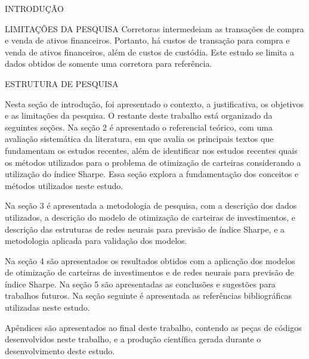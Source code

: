 \begin{section}{INTRODUÇÃO}
\begin{subsection}{LIMITAÇÕES DA PESQUISA}
        \ipar Corretoras intermedeiam as transações de compra e venda de ativos financeiros. Portanto, há custos de transação para compra e venda de ativos financeiros, além de custos de custódia. Este estudo se limita a dados obtidos de somente uma corretora para referência.

    \end{subsection}

    \begin{subsection}{ESTRUTURA DE PESQUISA}
    
        \ipar Nesta seção de introdução, foi apresentado o contexto, a justificativa, os objetivos e as limitações da pesquisa. O restante deste trabalho está organizado da seguintes seções. Na seção 2 é apresentado o referencial teórico, com uma avaliação sistemática da literatura, em que avalia os principais textos que fundamentam os estudos recentes, além de identificar nos estudos recentes quais os métodos utilizados para o problema de otimização de carteiras considerando a utilização do índice Sharpe. Essa seção explora a fundamentação dos conceitos e métodos utilizados neste estudo. 
        
        \ipar Na seção 3 é apresentada a metodologia de pesquisa, com a descrição dos dados utilizados, a descrição do modelo de otimização de carteiras de investimentos, e descrição das estruturas de redes neurais para previsão de índice Sharpe, e a metodologia aplicada para validação dos modelos.
        
        \ipar Na seção 4 são apresentados os resultados obtidos com a aplicação dos modelos de otimização de carteiras de investimentos e de redes neurais para previsão de índice Sharpe. Na seção 5 são apresentadas as conclusões e sugestões para trabalhos futuros. Na seção seguinte é apresentada as referências bibliográficas utilizadas neste estudo. 
        
        \ipar Apêndices são apresentados ao final deste trabalho, contendo as peças de códigos desenvolvidos neste trabalho, e a produção científica gerada durante o desenvolvimento deste estudo.

    \end{subsection}

\end{section}

\pagebreak